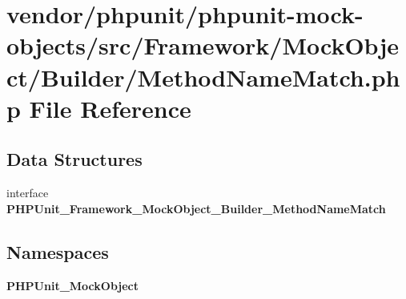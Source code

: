 \section{vendor/phpunit/phpunit-\/mock-\/objects/src/\+Framework/\+Mock\+Object/\+Builder/\+Method\+Name\+Match.php File Reference}
\label{_method_name_match_8php}
\subsection*{Data Structures}
\begin{DoxyCompactItemize}
\item 
interface {\bf P\+H\+P\+Unit\+\_\+\+Framework\+\_\+\+Mock\+Object\+\_\+\+Builder\+\_\+\+Method\+Name\+Match}
\end{DoxyCompactItemize}
\subsection*{Namespaces}
\begin{DoxyCompactItemize}
\item 
 {\bf P\+H\+P\+Unit\+\_\+\+Mock\+Object}
\end{DoxyCompactItemize}
